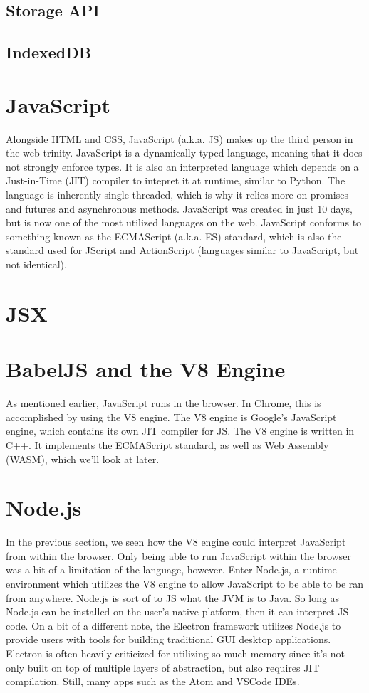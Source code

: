 \documentclass{article}
\begin{document}
\subsection{Storage API}

\subsection{IndexedDB}

\section{JavaScript}

Alongside HTML and CSS, JavaScript (a.k.a. JS) makes up the third person in the web trinity. JavaScript is a
dynamically typed language, meaning that it does not strongly enforce types. It is also an interpreted language
which depends on a Just-in-Time (JIT) compiler to intepret it at runtime, similar to Python. The language is
inherently single-threaded, which is why it relies more on promises and futures and asynchronous methods.
JavaScript was created in just 10 days, but is now one of the most utilized languages on the web. JavaScript
conforms to something known as the ECMAScript (a.k.a. ES) standard, which is also the standard used for
JScript and ActionScript (languages similar to JavaScript, but not identical).

\section{JSX}

\section{BabelJS and the V8 Engine}

As mentioned earlier, JavaScript runs in the browser. In Chrome, this is accomplished by using the V8 engine.
The V8 engine is Google's JavaScript engine, which contains its own JIT compiler for JS. The V8 engine is
written in C++. It implements the ECMAScript standard, as well as Web Assembly (WASM), which we'll look at
later.

\section{Node.js}

In the previous section, we seen how the V8 engine could interpret JavaScript from within the browser. Only
being able to run JavaScript within the browser was a bit of a limitation of the language, however. Enter
Node.js, a runtime environment which utilizes the V8 engine to allow JavaScript to be able to be ran from
anywhere. Node.js is sort of to JS what the JVM is to Java. So long as Node.js can be installed on the user's
native platform, then it can interpret JS code. On a bit of a different note, the Electron framework utilizes
Node.js to provide users with tools for building traditional GUI desktop applications. Electron is often
heavily criticized for utilizing so much memory since it's not only built on top of multiple layers of
abstraction, but also requires JIT compilation. Still, many apps such as the Atom and VSCode IDEs.
\end{document}
